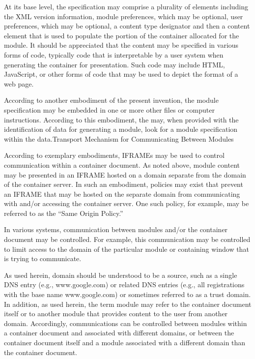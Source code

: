 At its base level,
the specification may comprise a plurality of elements including the
XML version information, module preferences, which may be optional,
user preferences, which may be optional, a content type designator and
then a content element that is used to populate the portion of the
container allocated for the module. It should be appreciated that the
content may be specified in various forms of code, typically code that
is interpretable by a user system when generating the container for
presentation. Such code may include HTML, JavaScript, or other forms
of code that may be used to depict the format of a web page.



According to another embodiment of the present
invention, the module specification may be embedded in one or more
other files or computer instructions. According to this embodiment,
the \moduleserver{} may, when provided with the identification
of data for generating a module, look for a module specification
within the data.Transport Mechanism for Communicating Between
Modules



According to exemplary embodiments,
IFRAMEs may be used to control communication within a container
document. As noted above, module content may be presented in an IFRAME
hosted on a domain separate from the domain of the container
server. In such an embodiment, policies may exist that prevent an
IFRAME that may be hosted on the separate domain from communicating
with and/or accessing the container server. One such policy, for
example, may be referred to as the ``Same Origin
Policy.''



In various systems,
communication between modules and/or the container document may be
controlled. For example, this communication may be controlled to limit
access to the domain of the particular module or containing window
that is trying to communicate.



As used
herein, domain should be understood to be a source, such as a single
DNS entry (e.g., www.google.com) or related DNS entries (e.g., all
registrations with the base name www.google.com) or sometimes referred
to as a trust domain. In addition, as used herein, the term module may
refer to the container document itself or to another module that
provides content to the user from another domain. Accordingly,
communications can be controlled between modules within a container
document and associated with different domains, or between the
container document itself and a module associated with a different
domain than the container document.



